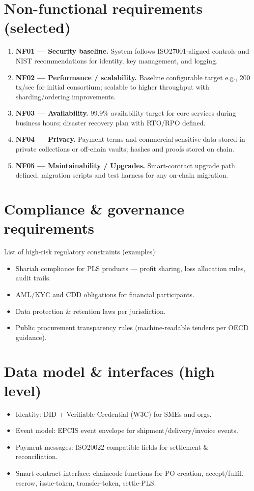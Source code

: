 \documentclass[11pt,a4paper]{article}
\begin{document}
\section{Non-functional requirements (selected)}
\begin{enumerate}[label=NF\arabic*:,leftmargin=*,itemsep=6pt]
\item \textbf{NF01 — Security baseline.} System follows ISO27001-aligned controls and NIST recommendations for identity, key management, and logging.
\item \textbf{NF02 — Performance / scalability.} Baseline configurable target e.g., 200 tx/sec for initial consortium; scalable to higher throughput with sharding/ordering improvements.
\item \textbf{NF03 — Availability.} 99.9\% availability target for core services during business hours; disaster recovery plan with RTO/RPO defined.
\item \textbf{NF04 — Privacy.} Payment terms and commercial-sensitive data stored in private collections or off-chain vaults; hashes and proofs stored on chain.
\item \textbf{NF05 — Maintainability / Upgrades.} Smart-contract upgrade path defined, migration scripts and test harness for any on-chain migration.
\end{enumerate}

\section{Compliance \& governance requirements}
List of high-risk regulatory constraints (examples):
\begin{itemize}
\item Shariah compliance for PLS products — profit sharing, loss allocation rules, audit trails.
\item AML/KYC and CDD obligations for financial participants.
\item Data protection \& retention laws per jurisdiction.
\item Public procurement transparency rules (machine-readable tenders per OECD guidance).
\end{itemize}

\section{Data model \& interfaces (high level)}
\begin{itemize}
\item Identity: DID + Verifiable Credential (W3C) for SMEs and orgs.
\item Event model: EPCIS event envelope for shipment/delivery/invoice events.
\item Payment messages: ISO20022-compatible fields for settlement \& reconciliation.
\item Smart-contract interface: chaincode functions for PO creation, accept/fulfil, escrow, issue-token, transfer-token, settle-PLS.
\end{itemize}
\end{document}
